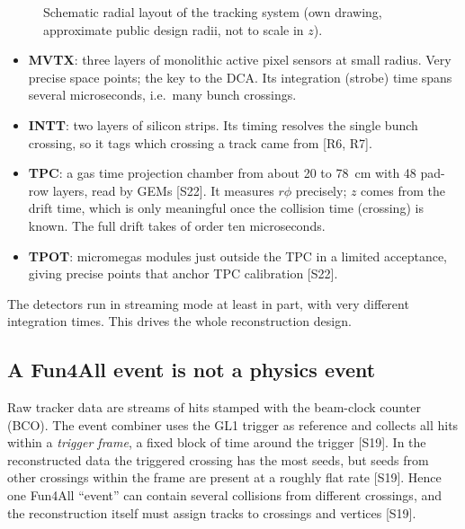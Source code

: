 \documentclass[11pt,letterpaper]{article}
\begin{document}
\begin{figure}[h]\centering
{}
\caption{Schematic radial layout of the tracking system (own drawing, approximate public design radii, not to scale in $z$).}\label{fig:layout}
\end{figure}

\begin{itemize}
\item \textbf{MVTX}: three layers of monolithic active pixel sensors at small radius. Very precise space points; the key to the DCA. Its integration (strobe) time spans several microseconds, i.e.\ many bunch crossings.
\item \textbf{INTT}: two layers of silicon strips. Its timing resolves the single bunch crossing, so it tags which crossing a track came from [R6, R7].
\item \textbf{TPC}: a gas time projection chamber from about 20 to 78~cm with 48 pad-row layers, read by GEMs [S22]. It measures $r\phi$ precisely; $z$ comes from the drift time, which is only meaningful once the collision time (crossing) is known. The full drift takes of order ten microseconds.
\item \textbf{TPOT}: micromegas modules just outside the TPC in a limited acceptance, giving precise points that anchor TPC calibration [S22].
\end{itemize}
The detectors run in streaming mode at least in part, with very different integration times.
This drives the whole reconstruction design.

\subsection{A Fun4All event is not a physics event}
Raw tracker data are streams of hits stamped with the beam-clock counter (BCO). The event combiner uses the GL1 trigger as reference and collects all hits within a \emph{trigger frame},
a fixed block of time around the trigger [S19]. In the reconstructed data the triggered crossing has the most seeds, but seeds from other crossings within the frame are present at a roughly flat rate [S19].
Hence one Fun4All ``event'' can contain several collisions from different crossings, and the reconstruction itself must assign tracks to crossings and vertices [S19].
\end{document}
